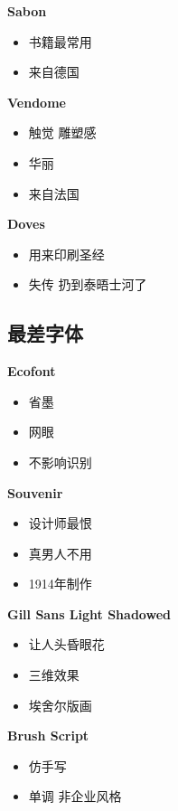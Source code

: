 \documentclass[
  letterpaper,
  DIV=11,
  numbers=noendperiod]{scrreprt}
\providecommand{\tightlist}{%
  \setlength{\itemsep}{0pt}\setlength{\parskip}{0pt}}\usepackage{longtable,booktabs,array}
\begin{document}
\textbf{Sabon}

\begin{itemize}
\tightlist
\item
  书籍最常用
\item
  来自德国
\end{itemize}

\textbf{Vendome}

\begin{itemize}
\tightlist
\item
  触觉 雕塑感
\item
  华丽
\item
  来自法国
\end{itemize}

\textbf{Doves}

\begin{itemize}
\tightlist
\item
  用来印刷圣经
\item
  失传 扔到泰晤士河了
\end{itemize}

\subsection{最差字体}\label{ux6700ux5deeux5b57ux4f53}

\textbf{Ecofont}

\begin{itemize}
\tightlist
\item
  省墨
\item
  网眼
\item
  不影响识别
\end{itemize}

\textbf{Souvenir}

\begin{itemize}
\tightlist
\item
  设计师最恨
\item
  真男人不用
\item
  1914年制作
\end{itemize}

\textbf{Gill Sans Light Shadowed}

\begin{itemize}
\tightlist
\item
  让人头昏眼花
\item
  三维效果
\item
  埃舍尔版画
\end{itemize}

\textbf{Brush Script}

\begin{itemize}
\tightlist
\item
  仿手写
\item
  单调 非企业风格
\end{itemize}
\end{document}
